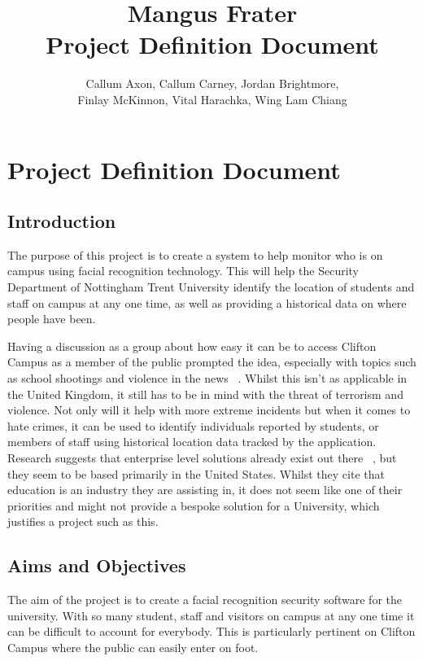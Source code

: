 \documentclass[11pt]{report}
\title{\textbf{Mangus Frater} \\ Project Definition Document}
\author{Callum Axon, Callum Carney, Jordan Brightmore, \\ Finlay McKinnon, Vital Harachka, Wing Lam Chiang}
\begin{document}
\maketitle

\chapter{Project Definition Document}

\section{Introduction}
The purpose of this project is to create a system to help monitor who is on campus using facial recognition technology. This will help the Security Department of Nottingham Trent University identify the location of students and staff on campus at any one time, as well as providing a historical data on where people have been. 

Having a discussion as a group about how easy it can be to access Clifton Campus as a member of the public prompted the idea, especially with topics such as school shootings and violence in the news ~\citep{bbcarticle}. Whilst this isn't as applicable in the United Kingdom, it still has to be in mind with the threat of terrorism and violence.
Not only will it help with more extreme incidents but when it comes to hate crimes, it can be used to identify individuals reported by students, or members of staff using historical location data tracked by the application.
Research suggests that enterprise level solutions already exist out there  ~\citep{facefirst}, but they seem to be based primarily in the United States. Whilst they cite that education is an industry they are assisting in, it does not seem like one of their priorities and might not provide a bespoke solution for a University, which justifies a project such as this.

\section{Aims and Objectives}
The aim of the project is to create a facial recognition security software for the university. With so many student, staff and visitors on campus at any one time it can be difficult to account for everybody. This is particularly pertinent on Clifton Campus where the public can easily enter on foot. 
\end{document}
